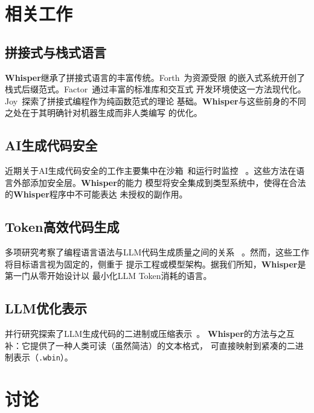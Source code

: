\documentclass[11pt,a4paper]{ctexart}
\begin{document}
\section{相关工作}
\label{sec:related}

\subsection{拼接式与栈式语言}

\textbf{Whisper}继承了拼接式语言的丰富传统。Forth~\cite{forth}为资源受限
的嵌入式系统开创了栈式后缀范式。Factor~\cite{factor}通过丰富的标准库和交互式
开发环境使这一方法现代化。Joy~\cite{joy}探索了拼接式编程作为纯函数范式的理论
基础。\textbf{Whisper}与这些前身的不同之处在于其明确针对机器生成而非人类编写
的优化。

\subsection{AI生成代码安全}

近期关于AI生成代码安全的工作主要集中在沙箱~\cite{seccomp,gvisor}和运行时监控
~\cite{code-sandbox}。这些方法在语言外部添加安全层。\textbf{Whisper}的能力
模型将安全集成到类型系统中，使得在合法的\textbf{Whisper}程序中不可能表达
未授权的副作用。

\subsection{Token高效代码生成}

多项研究考察了编程语言语法与LLM代码生成质量之间的关系
~\cite{codex,code-llm-survey}。然而，这些工作将目标语言视为固定的，侧重于
提示工程或模型架构。据我们所知，\textbf{Whisper}是第一门从零开始设计以
最小化LLM Token消耗的语言。

\subsection{LLM优化表示}

并行研究探索了LLM生成代码的二进制或压缩表示~\cite{llm-compression,wasm-generation}。
\textbf{Whisper}的方法与之互补：它提供了一种人类可读（虽然简洁）的文本格式，
可直接映射到紧凑的二进制表示（\texttt{.wbin}）。

\section{讨论}
\label{sec:discussion}
\end{document}

